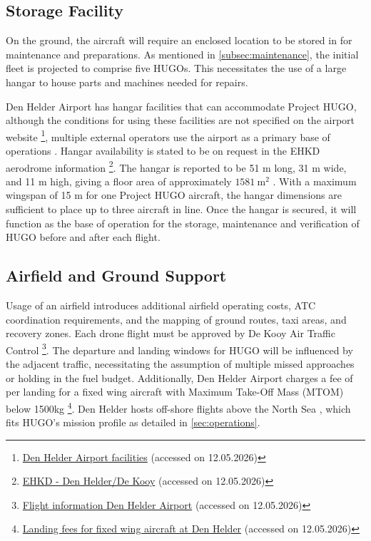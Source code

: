 \subsection{Storage Facility}
\label{subsec:hangar}
On the ground, the aircraft will require an enclosed location to be stored in for maintenance and preparations. As mentioned in \autoref{subsec:maintenance}, the initial fleet is projected to comprise five HUGOs. This necessitates the use of a large hangar to house parts and machines needed for repairs. 

Den Helder Airport has hangar facilities that can accommodate Project HUGO, although the conditions for using these facilities are not specified on the airport website \footnote{\label{fn:denhelder_facilities}\href{https://denhelderairport.nl/eng/airport/#faciliteiten}{Den Helder Airport facilities} (accessed on 12.05.2026)}, multiple external operators use the airport as a primary base of operations . Hangar availability is stated to be on request in the EHKD aerodrome information \footnote{\label{fn:ehkd_eaip}\href{https://eaip.lvnl.nl/web/eaip/AIRAC\%20AMDT\%2005-2026_2026_05_14/eAIP/EH-AD\%202\%20EHKD\%201-en-GB.html}{EHKD - Den Helder/De Kooy} (accessed on 12.05.2026)}. The hangar is reported to be 51 m long, 31 m wide, and 11 m high, giving a floor area of approximately \(1581~\mathrm{m^2}\) \cite{DenHelderAirport2013DHANieuwsbrief}. With a maximum wingspan of 15 m for one Project HUGO aircraft, the hangar dimensions are sufficient to place up to three aircraft in line. Once the hangar is secured, it will function as the base of operation for the storage, maintenance and verification of HUGO before and after each flight.

\subsection{Airfield and Ground Support}
\label{subsec:ground_support}
Usage of an airfield introduces additional airfield operating costs, ATC coordination requirements, and the mapping of ground routes, taxi areas, and recovery zones. Each drone flight must be approved by De Kooy Air Traffic Control \footnote{\href{https://denhelderairport.nl/eng/flight-information/}{Flight information Den Helder Airport} (accessed on 12.05.2026)}. The departure and landing windows for HUGO will be influenced by the adjacent traffic, necessitating the assumption of multiple missed approaches or holding in the fuel budget. Additionally, Den Helder Airport charges a fee of  per landing for a fixed wing aircraft with Maximum Take-Off Mass (MTOM) below 1500kg \footnote{\href{https://denhelderairport.nl/wp-content/uploads/2026/01/2026-fixed-wing-miv-01-01-2026-2.pdf}{Landing fees for fixed wing aircraft at Den Helder} (accessed on 12.05.2026)}.
Den Helder hosts off-shore flights above the North Sea , which fits HUGO's mission profile as detailed in \autoref{sec:operations}.



